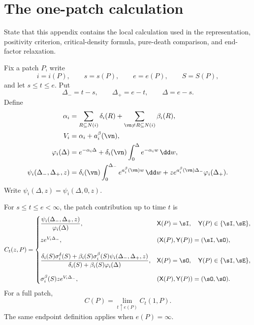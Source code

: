 \section{The one-patch calculation}
\label{app:patch-calculations}

\begin{discussion}
  \item State that this appendix contains the local calculation used in
  the representation, positivity criterion, critical-density formula,
  pure-death comparison, and end-factor relaxation.
\end{discussion}

\begin{notation}
\label{not:patch-calculation}
Fix a patch \(P\), write
\[
  i=i(P),\qquad s=s(P),\qquad e=e(P),\qquad S=S(P),
\]
and let \(s\le t\le e\). Put
\[
  \Delta_-=t-s,
  \qquad
  \Delta_+=e-t,
  \qquad
  \Delta=e-s.
\]
Define
\begin{align}
  \alpha_i
  &=
  \sum_{R\subseteq N(i)}\delta_i(R)
  +
  \sum_{\vn\ne R\subseteq N(i)}\beta_i(R),
  \label{eq:alpha-i}
  \\
  V_i
  &=
  \alpha_i+a_i^\beta(\vn),
  \label{eq:Vi-alpha}
  \\
  \varphi_i(\Delta)
  &=
  e^{-\alpha_i\Delta}
  +
  \delta_i(\vn)
  \int_0^\Delta e^{-\alpha_iw}\,\dd w,
  \label{eq:varphi}
  \\
  \psi_i(\Delta_-,\Delta_+,z)
  &=
  \delta_i(\vn)
  \int_0^{\Delta_-}e^{a_i^\beta(\vn)w}\,\dd w
  +
  z e^{a_i^\beta(\vn)\Delta_-}
  \varphi_i(\Delta_+).
  \label{eq:psi-two-time}
\end{align}
Write \(\psi_i(\Delta,z)=\psi_i(\Delta,0,z)\).
\end{notation}

\begin{proposition}
\label{prop:explicit-patch-factors}
For \(s\le t\le e<\infty\), the patch contribution up to time \(t\)
is
\begin{equation}
  C_t(z,P)
  =
  \begin{cases}
  \dfrac{
    \psi_i(\Delta_-,\Delta_+,z)
  }{
    \varphi_i(\Delta)
  },
  &
  \mathsf X(P)=\sI,\quad
  \mathsf Y(P)\in\{\sI,\sE\},
  \\[1.2em]
  z e^{V_i\Delta_-},
  &
  (\mathsf X(P),\mathsf Y(P))=(\sI,\sO),
  \\[1.2em]
  \dfrac{
    \delta_i(S)\sigma_i^\delta(S)
    +
    \beta_i(S)\sigma_i^\beta(S)
    \psi_i(\Delta_-,\Delta_+,z)
  }{
    \delta_i(S)+\beta_i(S)\varphi_i(\Delta)
  },
  &
  \mathsf X(P)=\sO,\quad
  \mathsf Y(P)\in\{\sI,\sE\},
  \\[1.5em]
  \sigma_i^\beta(S)z e^{V_i\Delta_-},
  &
  (\mathsf X(P),\mathsf Y(P))=(\sO,\sO).
  \end{cases}
  \label{eq:explicit-patch-factors}
\end{equation}
For a full patch,
\[
  C(P)=\lim_{t\uparrow e(P)}C_t(1,P).
\]
The same endpoint definition applies when \(e(P)=\infty\).
\end{proposition}

